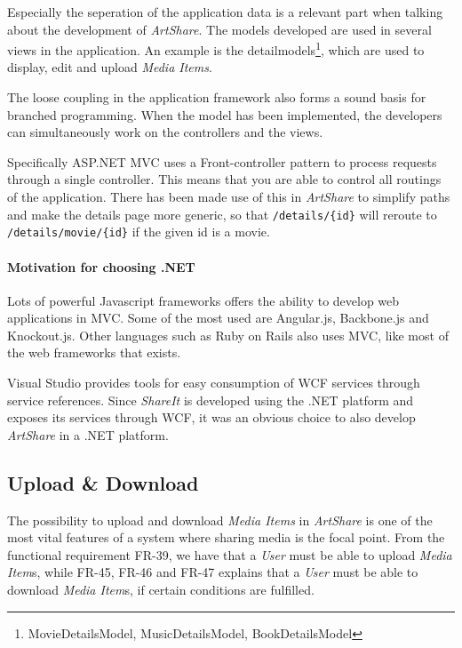 \documentclass[../report.tex]{subfiles}
\begin{document}
Especially the seperation of the application data is a relevant part when talking about the development of \textit{ArtShare}. The models developed are used in several views in the application. An example is the detailmodels\footnote{MovieDetailsModel, MusicDetailsModel, BookDetailsModel}, which are used to display, edit and upload \textit{Media Items}.

The loose coupling in the application framework also forms a sound basis for branched programming. When the model has been implemented, the developers can simultaneously work on the controllers and the views.

Specifically ASP.NET MVC uses a Front-controller pattern to process requests through a single controller. This means that you are able to control all routings of the application. There has been made use of this in \textit{ArtShare} to simplify paths and make the details page more generic, so that \texttt{/details/\{id\}} will reroute to \texttt{/details/movie/\{id\}} if the given id is a movie.

\paragraph{Motivation for choosing .NET}
Lots of powerful Javascript frameworks offers the ability to develop web applications in MVC. Some of the most used are Angular.js, Backbone.js and Knockout.js. Other languages such as Ruby on Rails also uses MVC, like most of the web frameworks that exists.

Visual Studio provides tools for easy consumption of WCF services through service references\cite{microsoftWCF}.
Since \textit{ShareIt} is developed using the .NET platform and exposes its services through WCF, it was an obvious choice to also develop \textit{ArtShare} in a .NET platform.

\subsection{Upload \& Download}

The possibility to upload and download \textit{Media Items} in \textit{ArtShare} is one of the most vital features of a system where sharing media is the focal point. From the functional requirement FR-39, we have that a \textit{User} must be able to upload \textit{Media Item}s, while FR-45, FR-46 and FR-47 explains that a \textit{User} must be able to download \textit{Media Item}s, if certain conditions are fulfilled.
\end{document}
